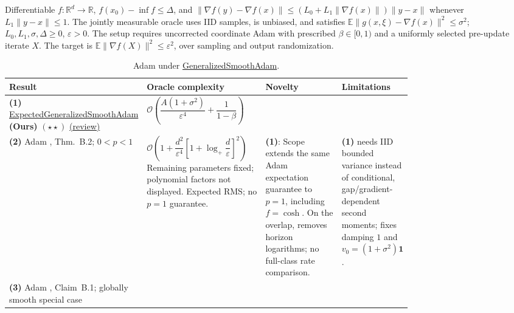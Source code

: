 \begin{table}[tp]
\centering
\caption{Adam under \href{https://github.com/k3nfalt/longtails/blob/main/LongTails/Setups/GeneralizedSmoothAdam.lean}{GeneralizedSmoothAdam}.}\label{tab:GeneralizedSmoothAdam}
\parbox{\linewidth}{\footnotesize Differentiable $f:\mathbb R^d\to\mathbb R$, $f(x_0)-\inf f\le\Delta$, and $\|\nabla f(y)-\nabla f(x)\|\le(L_0+L_1\|\nabla f(x)\|)\|y-x\|$ whenever $L_1\|y-x\|\le1$. The jointly measurable oracle uses IID samples, is unbiased, and satisfies $\mathbb E\|g(x,\xi)-\nabla f(x)\|^2\le\sigma^2$; $L_0,L_1,\sigma,\Delta\ge0$, $\varepsilon>0$. The setup requires uncorrected coordinate Adam with prescribed $\beta\in[0,1)$ and a uniformly selected pre-update iterate $X$. The target is $\mathbb E\|\nabla f(X)\|^2\le\varepsilon^2$, over sampling and output randomization.}\par\smallskip
\begin{threeparttable}
\footnotesize
\setlength{\tabcolsep}{4pt}\renewcommand{\arraystretch}{1.24}
\begin{tabularx}{\linewidth}{@{}>{\raggedright\arraybackslash}p{0.20\linewidth}>{\raggedright\arraybackslash}p{0.32\linewidth}>{\raggedright\arraybackslash}p{0.25\linewidth}>{\raggedright\arraybackslash}X@{}}
\toprule
\textbf{Result} & \textbf{Oracle complexity} & \textbf{Novelty} & \textbf{Limitations} \\
\midrule
\textbf{(1)} \href{https://github.com/k3nfalt/longtails/blob/main/LongTails/Theorems/ExpectedGeneralizedSmoothAdam.lean}{Expected\allowbreak Generalized\allowbreak Smooth\allowbreak Adam} \textbf{(Ours)} $(\star\star)$ \href{https://github.com/k3nfalt/longtails/blob/main/scripts/reviews/ExpectedGeneralizedSmoothAdam.md}{(review)}
& $\mathcal{O}\!\left(\dfrac{A(1+\sigma^2)}{\varepsilon^4}+\dfrac1{1-\beta}\right)$
& & \\
\midrule[1.2pt]
\textbf{(2)} Adam \citep{gsaJin2026v2}, Thm.~B.2; $0<p<1$
& $\mathcal{O}\!\left(1+\dfrac{d^2}{\varepsilon^4}\left[1+\log_+\dfrac d\varepsilon\right]^2\right)$ Remaining parameters fixed; polynomial factors not displayed. Expected RMS; no $p=1$ guarantee.
& \textbf{(1)}: Scope extends the same Adam expectation guarantee to $p=1$, including $f=\cosh$. On the overlap, removes horizon logarithms; no full-class rate comparison.
& \textbf{(1)} needs IID bounded variance instead of conditional, gap/gradient-dependent second moments; fixes damping $1$ and $v_0=(1+\sigma^2)\mathbf1$. \\
\midrule
\textbf{(3)} Adam \citep{gsaJin2026v2}, Claim~B.1; globally smooth special case

\end{tabularx}
\end{threeparttable}
\end{table}
